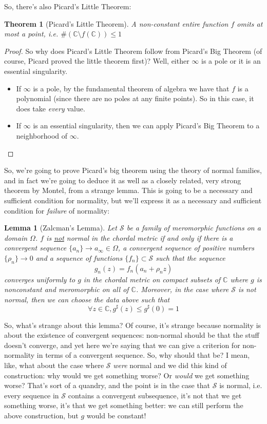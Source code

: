 \documentclass{article}
\newtheorem{theorem}{Theorem}
\newtheorem{lemma}{Lemma}
\newcommand{\mbb}[1]{\mathbb{#1}}
\newcommand{\mc}[1]{\mathcal{#1}}
\begin{document}
So, there's also Picard's Little Theorem:
\begin{theorem}[Picard's Little Theorem]
A non-constant entire function \(f\) omits at most a point, i.e. \(\#(\mbb{C}\setminus f(\mbb{C})) \leq 1\)
\end{theorem}
\begin{proof}
So why does Picard's Little Theorem follow from Picard's Big Theorem (of course, Picard proved the little theorem first)? Well, either \(\infty\) is a pole or it is an essential singularity.
\begin{itemize}

  \item If \(\infty\) is a pole, by the fundamental theorem of algebra we have that \(f\) is a polynomial (since there are no poles at any finite points). So in this case, it does take \textit{every} value.

  \item If \(\infty\) is an essential singularity, then we can apply Picard's Big Theorem to a neighborhood of \(\infty\).

\end{itemize}
\end{proof}
So, we're going to prove Picard's big theorem using the theory of normal families, and in fact we're going to deduce it as well as a closely related, very strong theorem by Montel, from a strange lemma. This is going to be a necessary and sufficient condition for normality, but we'll express it as a necessary and sufficient condition for \textit{failure} of normality:
\begin{lemma}[Zalcman's Lemma]
Let \(\mc{S}\) be a family of meromorphic functions on a domain \(\Omega\). \(f\) is \underline{not} normal in the chordal metric if and only if there is a convergent sequence \(\{a_n\} \to a_\infty \in \Omega\), a convergent sequence of positive numbers \(\{\rho_n\} \to 0\) and a sequence of functions \(\{f_n\} \subset \mc{S}\) such that the sequence
\[g_n(z) = f_n(a_n + \rho_n z)\]
converges uniformly to \(g\) in the chordal metric on compact subsets of \(\mbb{C}\) where \(g\) is nonconstant and meromorphic on all of \(\mbb{C}\). Moreover, in the case where \(\mc{S}\) is not normal, then we can choose the data above such that
\[\forall z \in \mbb{C}, g^\sharp(z) \leq g^\sharp(0) = 1\]
\end{lemma}
So, what's strange about this lemma? Of course, it's strange because normality is about the existence of convergent sequences: non-normal should be that the stuff doesn't converge, and yet here we're saying that we can give a criterion for non-normality in terms of a convergent sequence. So, why should that be? I mean, like, what about the case where \(\mc{S}\) \textit{were} normal and we did this kind of construction: why would we get something worse? Or \textit{would} we get something worse?
That's sort of a quandry, and the point is in the case that \(\mc{S}\) is normal, i.e. every sequence in \(\mc{S}\) contains a convergent subsequence, it's not that we get something worse, it's that we get something better: we can still perform the above construction, but \(g\) would be constant!
\end{document}
